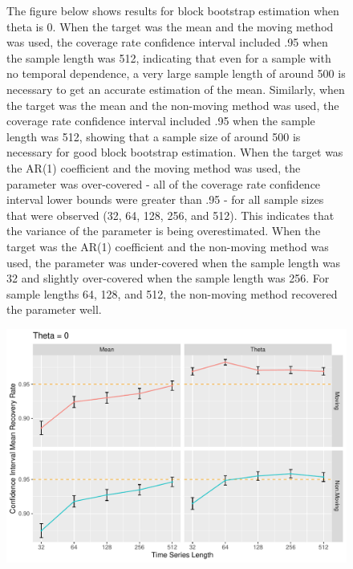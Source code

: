 \documentclass[12pt, letterpaper, titlepage]{article}
\begin{document}
\begin{figure}[tbp]
\caption{The figure below shows results for block bootstrap estimation when theta is 0. When the target was the mean and the moving method was used, the coverage rate confidence interval included .95 when the sample length was 512, indicating that even for a sample with no temporal dependence, a very large sample length of around 500 is necessary to get an accurate estimation of the mean. Similarly, when the target was the mean and the non-moving method was used, the coverage rate confidence interval included .95 when the sample length was 512, showing that a sample size of around 500 is necessary for good block bootstrap estimation. When the target was the AR(1) coefficient and the moving method was used, the parameter was over-covered - all of the coverage rate confidence interval lower bounds were greater than .95 - for all sample sizes that were observed (32, 64, 128, 256, and 512). This indicates that the variance of the parameter is being overestimated. When the target was the AR(1) coefficient and the non-moving method was used, the parameter was under-covered when the sample length was 32 and slightly over-covered when the sample length was 256. For sample lengths 64, 128, and 512, the non-moving method recovered the parameter well.}
  \centering
  \includegraphics[width=\textwidth]{theta_0}
  \caption{}
  \label{fig:theta_0}
\end{figure}
\end{document}
